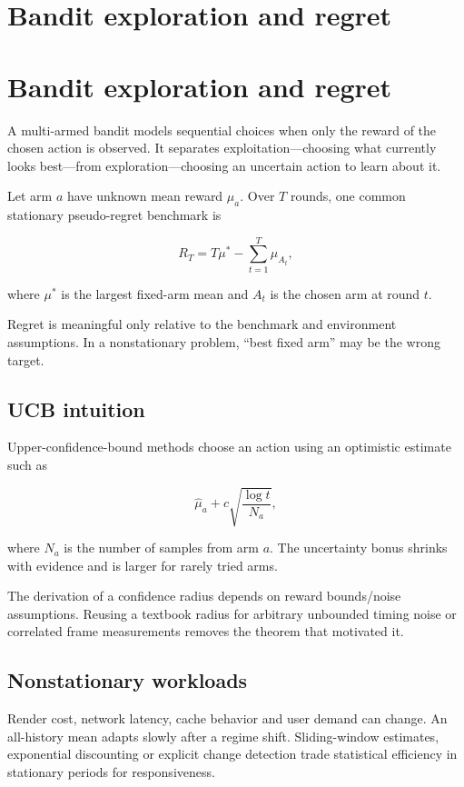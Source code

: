 \hypertarget{appendix-3dc863dbddf3}{}
\section*{Bandit exploration and regret}
\section{Bandit exploration and regret}\label{appendix-3dc863dbddf3-bandit-exploration-and-regret}

A multi-armed bandit models sequential choices when only the reward of the chosen action is observed. It separates exploitation---choosing what currently looks best---from exploration---choosing an uncertain action to learn about it.

Let arm \(a\) have unknown mean reward \(\mu_a\). Over \(T\) rounds, one common stationary pseudo-regret benchmark is

\[
R_T=T\mu^*-\sum_{t=1}^{T}\mu_{A_t},
\]

where \(\mu^*\) is the largest fixed-arm mean and \(A_t\) is the chosen arm at round \(t\).

Regret is meaningful only relative to the benchmark and environment assumptions. In a nonstationary problem, ``best fixed arm'' may be the wrong target.

\subsection{UCB intuition}\label{appendix-3dc863dbddf3-ucb-intuition}

Upper-confidence-bound methods choose an action using an optimistic estimate such as

\[
\hat\mu_a+
c\sqrt{\frac{\log t}{N_a}},
\]

where \(N_a\) is the number of samples from arm \(a\). The uncertainty bonus shrinks with evidence and is larger for rarely tried arms.

The derivation of a confidence radius depends on reward bounds/noise assumptions. Reusing a textbook radius for arbitrary unbounded timing noise or correlated frame measurements removes the theorem that motivated it.

\subsection{Nonstationary workloads}\label{appendix-3dc863dbddf3-nonstationary-workloads}

Render cost, network latency, cache behavior and user demand can change. An all-history mean adapts slowly after a regime shift. Sliding-window estimates, exponential discounting or explicit change detection trade statistical efficiency in stationary periods for responsiveness.

